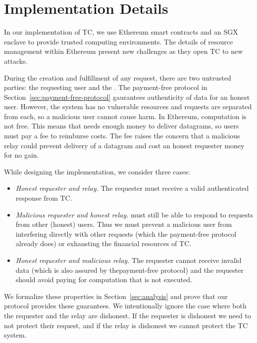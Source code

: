 
\section{\tc Implementation Details}
\label{sec:impl}

In our implementation of TC, we use Ethereum smart contracts and an SGX enclave to provide trusted computing environments.
The details of resource management within Ethereum present new challenges as they open TC to new attacks.

During the creation and fulfillment of any request, there are two untrusted parties: the requesting user and the \tc \medname.
The payment-free protocol in Section~\ref{sec:payment-free-protocol} gaurantees authenticity of data for an honest user.
However, the \tc system has no vulnerable resources and requests are separated from each, so a malicious user cannot cause harm.
In Ethereum, computation is not free.
This means that \tc needs enough money to deliver datagrams, so users must pay a fee to reimburse costs.
The fee raises the concern that a malicious relay could prevent delivery of a datagram and cost an honest requester money for no gain.

While designing the implementation, we consider three cases:
\begin{itemize}
  \item {\it Honest requester and relay.}
    The requester must receive a valid authenticated response from TC.

  \item {\it Malicious requester and honest relay.}
    \tc must still be able to respond to requests from other (honest) users.
    Thus we must prevent a malicious user from interfering directly with other requests (which the payment-free protocol already does)
    or exhausting the financial resources of TC.

  \item {\it Honest requester and malicious relay.}
    The requester cannot receive invalid data (which is also assured by thepayment-free protocol)
    and the requester should avoid paying for computation that is not executed.
\end{itemize}
We formalize these properties in Section~\ref{sec:analysis} and prove that our protocol provides these guarantees.
We intentionally ignore the case where both the requester and the relay are dishonest.
If the requester is dishonest we need to not protect their request, and if the relay is dishonest we cannot protect the TC system.


